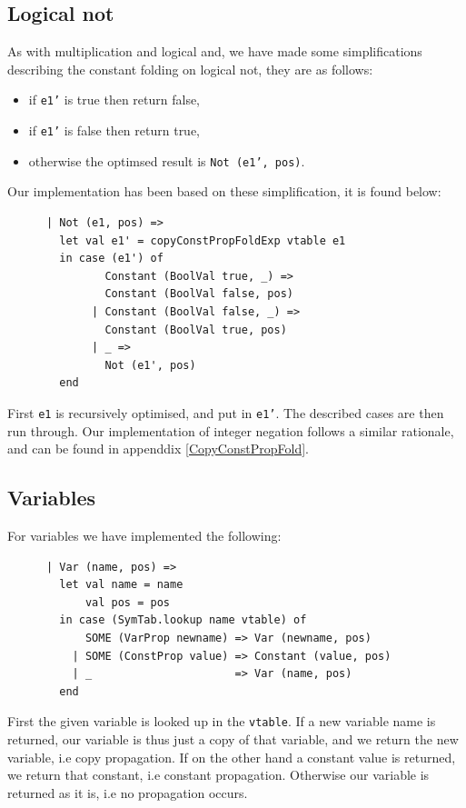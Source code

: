 \documentclass[11pt]{article}
\begin{document}
	\subsection{Logical not}
	As with multiplication and logical and, we have made some simplifications describing the
	constant folding on logical not, they are as follows:
	\begin{itemize}
	\item if \texttt{e1'} is true then return false,
	\item if \texttt{e1'} is false then return true,
	\item otherwise the optimsed result is  \texttt{Not (e1', pos)}.
	\end{itemize}
	Our implementation has been based on these simplification, it is found below:
	\begin{lstlisting}
      | Not (e1, pos) =>
        let val e1' = copyConstPropFoldExp vtable e1
        in case (e1') of
               Constant (BoolVal true, _) =>
               Constant (BoolVal false, pos)
             | Constant (BoolVal false, _) =>
               Constant (BoolVal true, pos)
             | _ =>
               Not (e1', pos)
        end
	\end{lstlisting}	
	First \texttt{e1} is recursively optimised, and put in \texttt{e1'}. The described cases are
	then run through. Our implementation of integer negation follows a similar rationale, and can
	be found in appenddix \ref{CopyConstPropFold}.
	\subsection{Variables}
	For variables we have implemented the following:
	\begin{lstlisting}
      | Var (name, pos) =>
        let val name = name
            val pos = pos
        in case (SymTab.lookup name vtable) of
            SOME (VarProp newname) => Var (newname, pos)
          | SOME (ConstProp value) => Constant (value, pos)
          | _                      => Var (name, pos)
        end
	\end{lstlisting}
	First the given variable is looked up in the \texttt{vtable}. If a new variable name is returned, our
	variable is thus just a copy of that variable, and we return the new variable, i.e copy propagation. If
	on the other hand a constant value is returned, we return that constant, i.e constant propagation.
	Otherwise our variable is returned as it is, i.e no propagation occurs.
\end{document}
